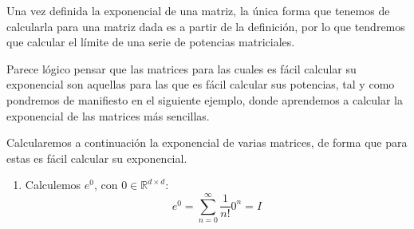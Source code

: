 \noindent
Una vez definida la exponencial de una matriz, la única forma que tenemos de calcularla para una matriz dada es a partir de la definición, por lo que tendremos que calcular el límite de una serie de potencias matriciales.

Parece lógico pensar que las matrices para las cuales es fácil calcular su exponencial son aquellas para las que es fácil calcular sus potencias, tal y como pondremos de manifiesto en el siguiente ejemplo, donde aprendemos a calcular la exponencial de las matrices más sencillas.
\begin{ejemplo}
    Calcularemos a continuación la exponencial de varias matrices, de forma que para estas es fácil calcular su exponencial.
    
    \begin{enumerate}
        \item Calculemos $e^0$, con $0\in \mathbb{R}^{d\times d}$:
            \begin{equation*}
                e^0 = \sum_{n=0}^{\infty} \dfrac{1}{n!}0^n = I
            \end{equation*}


\end{enumerate}
\end{ejemplo}
